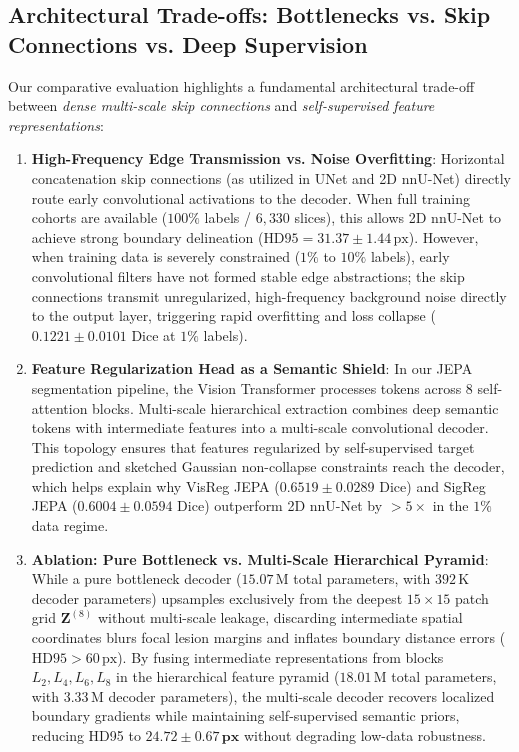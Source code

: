 \documentclass{article}
\begin{document}
\subsection{Architectural Trade-offs: Bottlenecks vs. Skip Connections vs. Deep Supervision}

Our comparative evaluation highlights a fundamental architectural trade-off between \emph{dense multi-scale skip connections} and \emph{self-supervised feature representations}:

\begin{enumerate}
    \item \textbf{High-Frequency Edge Transmission vs. Noise Overfitting}:
    Horizontal concatenation skip connections (as utilized in UNet and 2D nnU-Net) directly route early convolutional activations to the decoder. When full training cohorts are available ($100\%$ labels / $6,330$ slices), this allows 2D nnU-Net to achieve strong boundary delineation ($\text{HD95} = 31.37 \pm 1.44\,\text{px}$). However, when training data is severely constrained ($1\%$ to $10\%$ labels), early convolutional filters have not formed stable edge abstractions; the skip connections transmit unregularized, high-frequency background noise directly to the output layer, triggering rapid overfitting and loss collapse ($0.1221 \pm 0.0101$ Dice at $1\%$ labels).
    
    \item \textbf{Feature Regularization Head as a Semantic Shield}:
    In our JEPA segmentation pipeline, the Vision Transformer processes tokens across 8 self-attention blocks. Multi-scale hierarchical extraction combines deep semantic tokens with intermediate features into a multi-scale convolutional decoder. This topology ensures that features regularized by self-supervised target prediction and sketched Gaussian non-collapse constraints reach the decoder, which helps explain why VisReg JEPA ($0.6519 \pm 0.0289$ Dice) and SigReg JEPA ($0.6004 \pm 0.0594$ Dice) outperform 2D nnU-Net by $>5\times$ in the $1\%$ data regime.
    
    \item \textbf{Ablation: Pure Bottleneck vs. Multi-Scale Hierarchical Pyramid}:
    While a pure bottleneck decoder ($15.07\,\text{M}$ total parameters, with $392\,\text{K}$ decoder parameters) upsamples exclusively from the deepest $15 \times 15$ patch grid $\mathbf{Z}^{(8)}$ without multi-scale leakage, discarding intermediate spatial coordinates blurs focal lesion margins and inflates boundary distance errors ($\text{HD95} > 60\,\text{px}$). By fusing intermediate representations from blocks $L_2, L_4, L_6, L_8$ in the hierarchical feature pyramid ($18.01\,\text{M}$ total parameters, with $3.33\,\text{M}$ decoder parameters), the multi-scale decoder recovers localized boundary gradients while maintaining self-supervised semantic priors, reducing HD95 to $\mathbf{24.72 \pm 0.67\,\text{px}}$ without degrading low-data robustness.
    

\end{enumerate}
\end{document}
